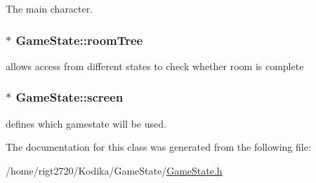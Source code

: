 The main character. 

\hypertarget{classGameState_acf694139ba8388f8258eeffdb75f0c3b}{
\subsubsection[{room\-Tree}]{$\ast$ Game\-State\-::room\-Tree\hspace{0.3cm}{\ttfamily [protected]}}}\label{classGameState_acf694139ba8388f8258eeffdb75f0c3b}


allows access from different states to check whether room is complete 

\hypertarget{classGameState_a877c0c626d54802e54e876a56dc6603b}{
\subsubsection[{screen}]{$\ast$ Game\-State\-::screen\hspace{0.3cm}{\ttfamily [protected]}}}\label{classGameState_a877c0c626d54802e54e876a56dc6603b}


defines which gamestate will be used. 



The documentation for this class was generated from the following file\-:\begin{DoxyCompactItemize}
\item 
/home/rigt2720/\-Kodika/\-Game\-State/\hyperlink{GameState_8h}{Game\-State.\-h}\end{DoxyCompactItemize}
